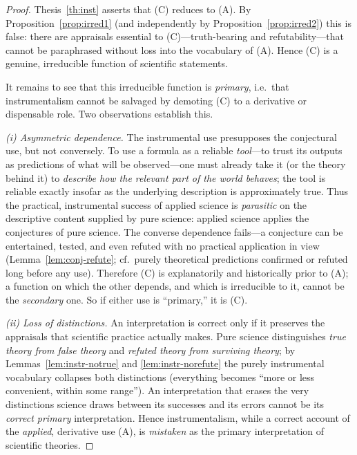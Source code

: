 \documentclass{amsart}
\theoremstyle{definition}
\theoremstyle{plain}
\begin{document}
\begin{proof}
Thesis~\ref{th:inst} asserts that (C) reduces to (A). By
Proposition~\ref{prop:irred1} (and independently by
Proposition~\ref{prop:irred2}) this is false: there are appraisals essential to
(C)---truth-bearing and refutability---that cannot be paraphrased without loss
into the vocabulary of (A). Hence (C) is a genuine, irreducible function of
scientific statements.

It remains to see that this irreducible function is \emph{primary}, i.e.\ that
instrumentalism cannot be salvaged by demoting (C) to a derivative or
dispensable role. Two observations establish this.

\emph{(i) Asymmetric dependence.} The instrumental use presupposes the
conjectural use, but not conversely. To use a formula as a reliable
\emph{tool}---to trust its outputs as predictions of what will be
observed---one must already take it (or the theory behind it) to \emph{describe
how the relevant part of the world behaves}; the tool is reliable exactly
insofar as the underlying description is approximately true. Thus the
practical, instrumental success of applied science is \emph{parasitic} on the
descriptive content supplied by pure science: applied science applies the
conjectures of pure science. The converse dependence fails---a conjecture can
be entertained, tested, and even refuted with no practical application in view
(Lemma~\ref{lem:conj-refute}; cf.\ purely theoretical predictions confirmed or
refuted long before any use). Therefore (C) is explanatorily and historically
prior to (A); a function on which the other depends, and which is irreducible
to it, cannot be the \emph{secondary} one. So if either use is ``primary,'' it
is (C).

\emph{(ii) Loss of distinctions.} An interpretation is correct only if it
preserves the appraisals that scientific practice actually makes. Pure science
distinguishes \emph{true theory from false theory} and \emph{refuted theory
from surviving theory}; by Lemmas~\ref{lem:instr-notrue} and
\ref{lem:instr-norefute} the purely instrumental vocabulary collapses both
distinctions (everything becomes ``more or less convenient, within some
range''). An interpretation that erases the very distinctions science draws
between its successes and its errors cannot be its \emph{correct primary}
interpretation. Hence instrumentalism, while a correct account of the
\emph{applied}, derivative use (A), is \emph{mistaken} as the primary
interpretation of scientific theories.
\end{proof}
\end{document}
